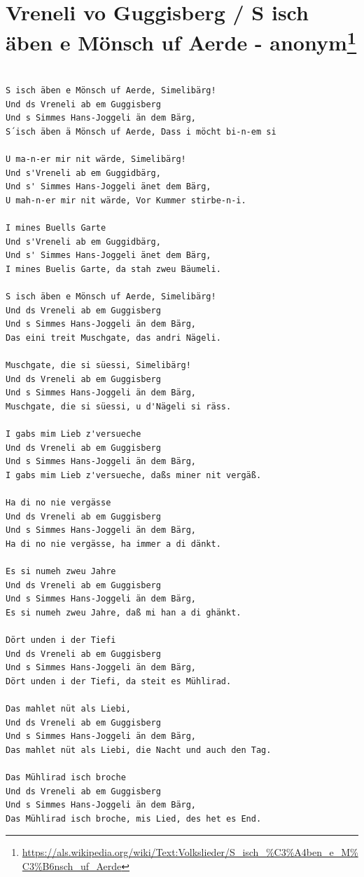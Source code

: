 \documentclass[
]{book}
\let\stdsection\section
\renewcommand\section{\clearpage\stdsection}
\begin{document}
\hypertarget{volkslieder-guggisberg}{%
\section[Vreneli vo Guggisberg / S isch äben e Mönsch uf Aerde - anonym]{\texorpdfstring{Vreneli vo Guggisberg / S isch äben e Mönsch uf Aerde - anonym\footnote{\url{https://als.wikipedia.org/wiki/Text:Volkslieder/S_isch_\%C3\%A4ben_e_M\%C3\%B6nsch_uf_Aerde}}}{Vreneli vo Guggisberg / S isch äben e Mönsch uf Aerde - anonym}}\label{volkslieder-guggisberg}}

\begin{verbatim}

S isch äben e Mönsch uf Aerde, Simelibärg!
Und ds Vreneli ab em Guggisberg
Und s Simmes Hans-Joggeli än dem Bärg,
S´isch äben ä Mönsch uf Aerde, Dass i möcht bi-n-em si

U ma-n-er mir nit wärde, Simelibärg!
Und s'Vreneli ab em Guggidbärg,
Und s' Simmes Hans-Joggeli änet dem Bärg,
U mah-n-er mir nit wärde, Vor Kummer stirbe-n-i.

I mines Buells Garte
Und s'Vreneli ab em Guggidbärg,
Und s' Simmes Hans-Joggeli änet dem Bärg,
I mines Buelis Garte, da stah zweu Bäumeli.

S isch äben e Mönsch uf Aerde, Simelibärg!
Und ds Vreneli ab em Guggisberg
Und s Simmes Hans-Joggeli än dem Bärg,
Das eini treit Muschgate, das andri Nägeli.

Muschgate, die si süessi, Simelibärg!
Und ds Vreneli ab em Guggisberg
Und s Simmes Hans-Joggeli än dem Bärg,
Muschgate, die si süessi, u d'Nägeli si räss.

I gabs mim Lieb z'versueche
Und ds Vreneli ab em Guggisberg
Und s Simmes Hans-Joggeli än dem Bärg,
I gabs mim Lieb z'versueche, daßs miner nit vergäß.

Ha di no nie vergässe
Und ds Vreneli ab em Guggisberg
Und s Simmes Hans-Joggeli än dem Bärg,
Ha di no nie vergässe, ha immer a di dänkt.

Es si numeh zweu Jahre
Und ds Vreneli ab em Guggisberg
Und s Simmes Hans-Joggeli än dem Bärg,
Es si numeh zweu Jahre, daß mi han a di ghänkt.

Dört unden i der Tiefi
Und ds Vreneli ab em Guggisberg
Und s Simmes Hans-Joggeli än dem Bärg,
Dört unden i der Tiefi, da steit es Mühlirad.

Das mahlet nüt als Liebi,
Und ds Vreneli ab em Guggisberg
Und s Simmes Hans-Joggeli än dem Bärg,
Das mahlet nüt als Liebi, die Nacht und auch den Tag.

Das Mühlirad isch broche
Und ds Vreneli ab em Guggisberg
Und s Simmes Hans-Joggeli än dem Bärg,
Das Mühlirad isch broche, mis Lied, des het es End.
\end{verbatim}
\end{document}
